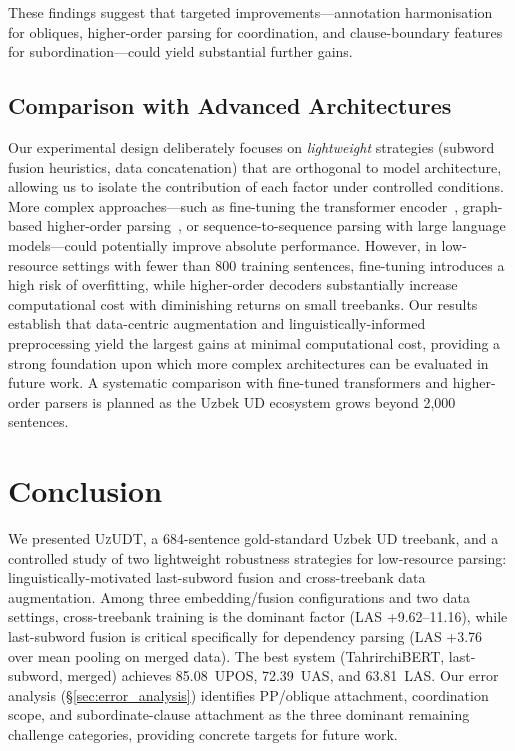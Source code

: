 \documentclass[runningheads]{llncs}
\begin{document}
These findings suggest that targeted improvements---annotation harmonisation for obliques, higher-order parsing for coordination, and clause-boundary features for subordination---could yield substantial further gains.

\subsection{Comparison with Advanced Architectures}
\label{sec:advanced_comparison}

Our experimental design deliberately focuses on \emph{lightweight} strategies (subword fusion heuristics, data concatenation) that are orthogonal to model architecture, allowing us to isolate the contribution of each factor under controlled conditions.
More complex approaches---such as fine-tuning the transformer encoder~\cite{kondratyuk-straka-2019-75}, graph-based higher-order parsing~\cite{DBLP:conf/acl/ZhangZZL20}, or sequence-to-sequence parsing with large language models---could potentially improve absolute performance.
However, in low-resource settings with fewer than 800 training sentences, fine-tuning introduces a high risk of overfitting, while higher-order decoders substantially increase computational cost with diminishing returns on small treebanks.
Our results establish that data-centric augmentation and linguistically-informed preprocessing yield the largest gains at minimal computational cost, providing a strong foundation upon which more complex architectures can be evaluated in future work.
A systematic comparison with fine-tuned transformers and higher-order parsers is planned as the Uzbek UD ecosystem grows beyond 2{,}000 sentences.

\section{Conclusion}
\label{sec:conclusion}

We presented \textsc{UzUDT}, a 684-sentence gold-standard Uzbek UD
treebank, and a controlled study of two lightweight robustness
strategies for low-resource parsing: linguistically-motivated
last-subword fusion and cross-treebank data augmentation.
Among three embedding/fusion configurations and two data settings,
cross-treebank training is the dominant factor (LAS
+9.62--11.16), while last-subword fusion is critical specifically
for dependency parsing (LAS +3.76 over mean pooling on merged data).
The best system (TahrirchiBERT, last-subword, merged) achieves
85.08~UPOS, 72.39~UAS, and 63.81~LAS.
Our error analysis (\S\ref{sec:error_analysis}) identifies PP/oblique attachment, coordination scope, and subordinate-clause attachment as the three dominant remaining challenge categories, providing concrete targets for future work.
\end{document}
